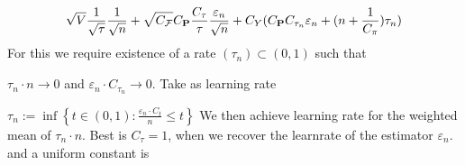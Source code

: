 \begin{gather}
  \sqrt{V}\frac{1}{\sqrt{\tau}}\frac{1}{\sqrt{n}}
  +
  \sqrt{C_\mathcal{F}}
  C_\P
  \frac{C_\tau}{\tau}
  \frac{\varepsilon_n}{\sqrt{n}}
  +
  C_Y
  (
  C_\P 
  C_{\tau_n}
  \varepsilon_n
  +
  (n
  +
  \frac{1}{C_\pi}
  )
  \tau_n
  )
\end{gather}
For this we require
existence of a rate $(\tau_n) \subset (0,1)
$
such that

$
\tau_n\cdot n \to 0
$
and
$
\varepsilon_n
\cdot
  C_{\tau_n}
  \to 0
$.
Take as learning rate 

$
\tau_n
:=
\inf
\left\{ 
t \in (0,1)
\colon
\frac{
\varepsilon_n
\cdot
  C_{t}
}{n}
  \le
  t
\right\}
$
We then achieve learning rate for the weighted mean of $\tau_n\cdot n$.
Best is $C_\tau=1$, when we recover the learnrate of the estimator $\varepsilon_n$.
and a uniform constant is 


